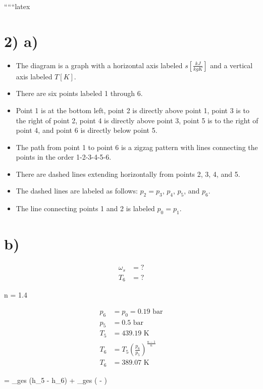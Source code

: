 
``````latex


\section*{2) a)}

\begin{itemize}
    \item The diagram is a graph with a horizontal axis labeled $s \left[ \frac{kJ}{kgK} \right]$ and a vertical axis labeled $T \left[ K \right]$.
    \item There are six points labeled 1 through 6.
    \item Point 1 is at the bottom left, point 2 is directly above point 1, point 3 is to the right of point 2, point 4 is directly above point 3, point 5 is to the right of point 4, and point 6 is directly below point 5.
    \item The path from point 1 to point 6 is a zigzag pattern with lines connecting the points in the order 1-2-3-4-5-6.
    \item There are dashed lines extending horizontally from points 2, 3, 4, and 5.
    \item The dashed lines are labeled as follows: $p_2 = p_3$, $p_4$, $p_5$, and $p_6$.
    \item The line connecting points 1 and 2 is labeled $p_0 = p_1$.
\end{itemize}

\section*{b)}

\begin{align*}
    \omega_s &= ? \\
    T_6 &= ?
\end{align*}

 \quad n = 1.4

\begin{align*}
    p_6 &= p_0 = 0.19 \text{ bar} \\
    p_5 &= 0.5 \text{ bar} \\
    T_5 &= 439.19 \text{ K} \\
    T_6 &= T_5 \left( \frac{p_6}{p_5} \right)^{\frac{n-1}{n}} \\
    T_6 &= 389.07 \text{ K}
\end{align*}

  = _{ges} (h_5 - h_6) + _{ges} \left(  -  \right)

